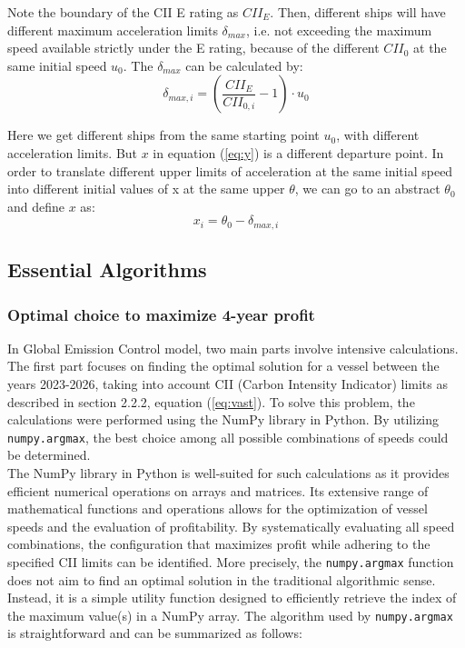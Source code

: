 \documentclass[a4paper,12pt]{article}
\begin{document}
Note the boundary of the CII E rating as $CII_E$.
Then, different ships will have different maximum acceleration limits $\delta_{max}$, i.e. not exceeding the maximum speed available strictly under the E rating, because of the different $CII_0$ at the same initial speed $u_0$. The $\delta_{max}$ can be calculated by:
\begin{equation}
	\delta_{max,i} = \left( \dfrac{CII_E}{CII_{0,i}} -1 \right) \cdot u_0
\end{equation}

Here we get different ships from the same starting point $u_0$, with different acceleration limits.
But $x$ in equation (\ref{eq:y}) is a different departure point. In order to translate different upper limits of acceleration at the same initial speed into different initial values of x at the same upper $\theta$, we can go to an abstract $\theta_0$ and define $x$ as:
\begin{equation}
	x_i = \theta_0 - \delta_{max,i}
\end{equation}

\subsection{Essential Algorithms}
\subsubsection{Optimal choice to maximize 4-year profit}

In Global Emission Control model, two main parts involve intensive calculations.
The first part focuses on finding the optimal solution for a vessel between the years 2023-2026, taking into account CII (Carbon Intensity Indicator) limits as described in section 2.2.2, equation ({\ref{eq:vast}}).
To solve this problem, the calculations were performed using the NumPy library in Python.
By utilizing \texttt{numpy.argmax}, the best choice among all possible combinations of speeds could be determined.\\

The NumPy library in Python is well-suited for such calculations as it provides efficient numerical operations on arrays and matrices.
Its extensive range of mathematical functions and operations allows for the optimization of vessel speeds and the evaluation of profitability.
By systematically evaluating all speed combinations, the configuration that maximizes profit while adhering to the specified CII limits can be identified.
More precisely, the \texttt{numpy.argmax} function does not aim to find an optimal solution in the traditional algorithmic sense. Instead, it is a simple utility function designed to efficiently retrieve the index of the maximum value(s) in a NumPy array.
The algorithm used by \texttt{numpy.argmax} is straightforward and can be summarized as follows:
\end{document}
